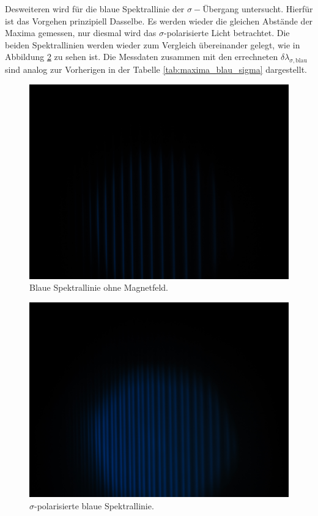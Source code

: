 Desweiteren wird für die blaue Spektrallinie der $\sigma-$Übergang untersucht. Hierfür ist das Vorgehen prinzipiell Dasselbe. Es werden wieder 
die gleichen Abstände der Maxima gemessen, nur diesmal wird das $\sigma$-polarisierte Licht betrachtet. Die beiden Spektrallinien werden wieder 
zum Vergleich übereinander gelegt, wie in Abbildung \ref{fig:blau_sigma} zu sehen ist. Die Messdaten zusammen mit den errechneten $\delta\lambda_{\sigma,\text{blau}}$
sind analog zur Vorherigen in der Tabelle \ref{tab:maxima_blau_sigma} dargestellt.\\

\begin{figure}
    \centering
    \includegraphics[width=\textwidth]{fotos/blau_0.JPG}
    \caption{Blaue Spektrallinie ohne Magnetfeld.}
    \label{fig:blau_0}
\end{figure}
\hfill
\begin{figure}
    \centering
    \includegraphics[width=\textwidth]{fotos/blau_sigma.JPG}
    \caption{$\sigma$-polarisierte blaue Spektrallinie.}
    \label{fig:blau_sigma}
\end{figure}
\FloatBarrier

